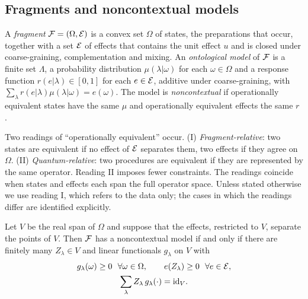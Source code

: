 \subsection{Fragments and noncontextual models}
\label{sec:models}

\begin{definition}
A \emph{fragment} $\mathcal{F}=(\Omega,\mathcal{E})$ is a convex set $\Omega$ of states, the preparations that occur, together with a set $\mathcal{E}$ of effects that contains the unit effect $u$ and is closed under coarse-graining, complementation and mixing. An \emph{ontological model} of $\mathcal{F}$ is a finite set $\Lambda$, a probability distribution $\mu(\lambda|\omega)$ for each $\omega\in\Omega$ and a response function $r(e|\lambda)\in[0,1]$ for each $e\in\mathcal{E}$, additive under coarse-graining, with $\sum_\lambda r(e|\lambda)\mu(\lambda|\omega)=e(\omega)$. The model is \emph{noncontextual} if operationally equivalent states have the same $\mu$ and operationally equivalent effects the same $r$ \cite{spekkens2005}.
\end{definition}

Two readings of ``operationally equivalent'' occur. (I) \emph{Fragment-relative}: two states are equivalent if no effect of $\mathcal{E}$ separates them, two effects if they agree on $\Omega$. (II) \emph{Quantum-relative}: two procedures are equivalent if they are represented by the same operator. Reading II imposes fewer constraints. The readings coincide when states and effects each span the full operator space. Unless stated otherwise we use reading I, which refers to the data only; the cases in which the readings differ are identified explicitly.

\begin{lemma}
\label{lem:simplex}
Let $V$ be the real span of $\Omega$ and suppose that the effects, restricted to $V$, separate the points of $V$. Then $\mathcal{F}$ has a noncontextual model if and only if there are finitely many $Z_\lambda\in V$ and linear functionals $g_\lambda$ on $V$ with
\begin{equation}
\begin{gathered}
g_\lambda(\omega)\ge0\ \ \forall\omega\in\Omega,\qquad e(Z_\lambda)\ge0\ \ \forall e\in\cE,\\
\sum_\lambda Z_\lambda\,g_\lambda(\cdot)=\mathrm{id}_V .
\end{gathered}
\label{eq:simplex}
\end{equation}
\end{lemma}

